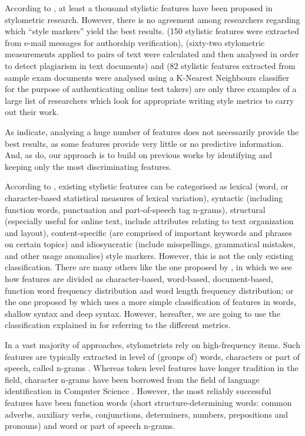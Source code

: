 According to \cite{rudman1997state}, at least a thousand stylistic features have been proposed in stylometric research. However, there is no agreement among researchers regarding which ``style markers'' yield the best results. \cite{chen2011authorship} (150 stylistic features were extracted from e-mail messages for authorship verification), \cite{gruner2005tool} (sixty-two stylometric measurements applied to pairs of text were calculated and then analysed in order to detect plagiarism in text documents) and \cite{canales2011stylometry} (82 stylistic features extracted from sample exam documents were analysed using a K-Nearest Neighbours classifier for the purpose of authenticating online test takers) are only three examples of a large list of researchers which look for appropriate writing style metrics to carry out their work.

As \cite{brocardo2013authorship} indicate, analysing a huge number of features does not necessarily provide the best results, as some features provide very little or no predictive information. And, as \cite{brocardo2013authorship} do, our approach is to build on previous works by identifying and keeping only the most discriminating features.

According to \cite{abbasi2008writeprints}, existing stylistic features can be categorised as lexical (word, or character-based statistical measures of lexical variation), syntactic (including function words, punctuation and part-of-speech tag n-grams), structural (especially useful for online text, include attributes relating to text organization and layout), content-specific (are comprised of important keywords and phrases on certain topics) and idiosyncratic (include misspellings, grammatical mistakes, and other usage anomalies) style markers. However, this is not the only existing classification. There are many others like the one proposed by \cite{corney2001identifying}, in which we see how features are divided as character-based, word-based, document-based, function word frequency distribution and word length frequency distribution; or the one proposed by \cite{cfgstylo} which uses a more simple classification of features in words, shallow syntax and deep syntax. However, hereafter, we are going to use the classification explained in \cite{abbasi2008writeprints} for referring to the different metrics.

In a vast majority of approaches, stylometrists rely on high-frequency items. Such features are typically extracted in level of (groups of) words, characters or part of speech, called n-grams \citep{kjell1994discrimination}. Whereas token level features have longer tradition in the field, character n-grams have been borrowed from the field of language identification in Computer Science \citep{stamatatos2009survey, eder2011style}. However, the most reliably successful features have been function words (short structure-determining words: common adverbs, auxiliary verbs, conjunctions, determiners, numbers, prepositions and pronouns) and word or part of speech n-grams. 


